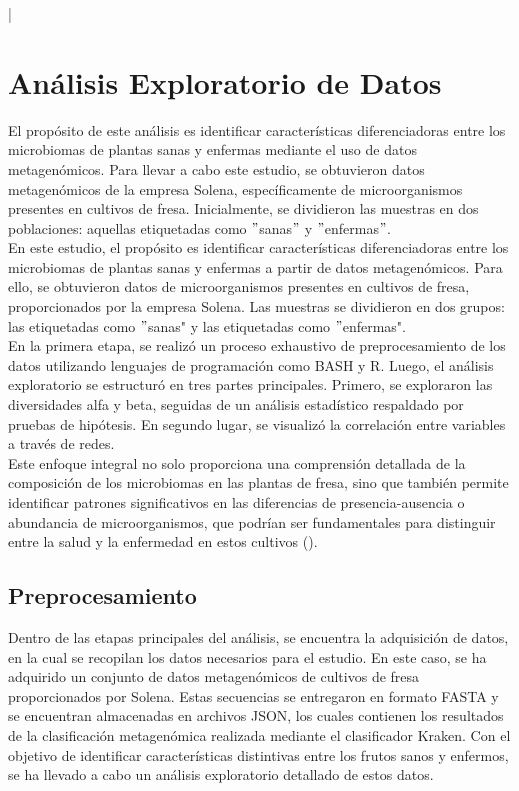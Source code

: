 |\chapter{Análisis Exploratorio de Datos}
El propósito de este análisis es identificar características diferenciadoras entre los microbiomas de plantas sanas y enfermas mediante el uso de datos metagenómicos. Para llevar a cabo este estudio, se obtuvieron datos metagenómicos de la empresa Solena, específicamente de microorganismos presentes en cultivos de fresa. Inicialmente, se dividieron las muestras en dos poblaciones: aquellas etiquetadas como $"$sanas$"$ y $"$enfermas$"$.\\

En este estudio, el propósito es identificar características diferenciadoras entre los microbiomas de plantas sanas y enfermas a partir de datos metagenómicos. Para ello, se obtuvieron datos de microorganismos presentes en cultivos de fresa, proporcionados por la empresa Solena. Las muestras se dividieron en dos grupos: las etiquetadas como $"$sanas" y las etiquetadas como $"$enfermas".\\

En la primera etapa, se realizó un proceso exhaustivo de preprocesamiento de los datos utilizando lenguajes de programación como BASH y R. Luego, el análisis exploratorio se estructuró en tres partes principales. Primero, se exploraron las diversidades alfa y beta, seguidas de un análisis estadístico respaldado por pruebas de hipótesis. En segundo lugar, se visualizó la correlación entre variables a través de redes.\\

Este enfoque integral no solo proporciona una comprensión detallada de la composición de los microbiomas en las plantas de fresa, sino que también permite identificar patrones significativos en las diferencias de presencia-ausencia o abundancia de microorganismos, que podrían ser fundamentales para distinguir entre la salud y la enfermedad en estos cultivos (\cite{yang2020}).\\

\section{Preprocesamiento}
Dentro de las etapas principales del análisis, se encuentra la adquisición de datos, en la cual se recopilan los datos necesarios para el estudio. En este caso, se ha adquirido un conjunto de datos metagenómicos de cultivos de fresa proporcionados por Solena. Estas secuencias se entregaron en formato FASTA y se encuentran almacenadas en archivos JSON, los cuales contienen los resultados de la clasificación metagenómica realizada mediante el clasificador Kraken. Con el objetivo de identificar características distintivas entre los frutos sanos y enfermos, se ha llevado a cabo un análisis exploratorio detallado de estos datos.\\


